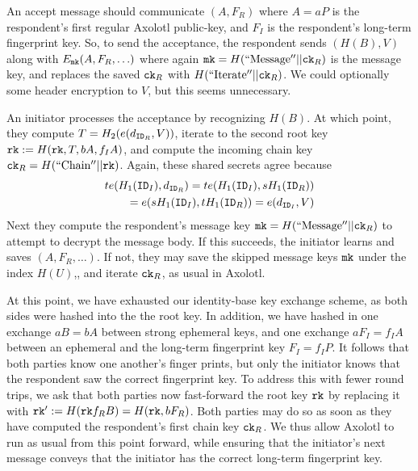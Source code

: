 \documentclass[twoside,letterpaper]{sig-alternate}
\def\mathperiod{.}
\def\mathperiod{}
\begin{document}
An accept message should communicate $(A,F_R)$ where
 $A = a P$ is the respondent's first regular Axolotl public-key, and
 $F_I$ is the respondent's long-term fingerprint key.
So, to send the acceptance, the respondent
sends $(H(B),V)$ along with $E_{\mathtt{mk}}(A,F_R,\ldots)$ where again
 $\mathtt{mk} = H(\mathrm{``Message''}  || \mathtt{ck}_R)$ is the message key,
and replaces the saved $\mathtt{ck}_R$ with $H(\mathrm{``Iterate''} || \mathtt{ck}_R)$.
We could optionally some header encryption to $V$, but this seems unnecessary.

\smallskip

An initiator processes the acceptance by recognizing $H(B)$.
At which point, they compute $T = H_2( e(d_{\mathtt{ID}_R}, V) )$,
iterate to the second root key $\mathtt{rk} := H(\mathtt{rk}, T, b A, f_I A )$, and
compute the incoming chain key $\mathtt{ck}_R = H(\mathrm{``Chain''} || \mathtt{rk})$.
Again, these shared secrets agree because
\begin{align*}
t e(H_1(\ID_I), d_{\ID_R}) = t e(H_1(\ID_I), s H_1(\ID_R)) \\
 \quad = e(s H_1(\ID_I), t H_1(\ID_R)) = e(d_{\ID_I}, V) \mathperiod
\end{align*}
Next they compute the respondent's
 message key $\mathtt{mk} = H(\mathrm{``Message''}  || \mathtt{ck}_R)$
to attempt to decrypt the message body.
If this succeeds, the initiator learns and saves $(A,F_R,\ldots)$.
If not, they may save the skipped message keys $\mathtt{mk}$ under the index $H(U)$,,
and iterate $\mathtt{ck}_R$, as usual in Axolotl.

At this point, we have exhausted our identity-base key exchange scheme,
 as both sides were hashed into the the root key.  In addition, we have
hashed in one exchange $a B = b A$ between strong ephemeral keys, and
one exchange $a F_I = f_I A$ between an ephemeral and
 the long-term fingerprint key $F_I = f_I P$.
It follows that both parties know one another's finger prints, but only
the initiator knows that the respondent saw the correct fingerprint key.
To address this with fewer round trips, we ask that both parties
now fast-forward the root key $\mathtt{rk}$ by replacing it with
 $\mathtt{rk}' := H(\mathtt{rk} f_R B) = H(\mathtt{rk}, b F_R )$.
Both parties may do so as soon as they have computed the respondent's
 first chain key $\mathtt{ck}_R$.
We thus allow Axolotl to run as usual from this point forward, while
ensuring that the initiator's next message conveys that the initiator
 has the correct long-term fingerprint key.
\end{document}
